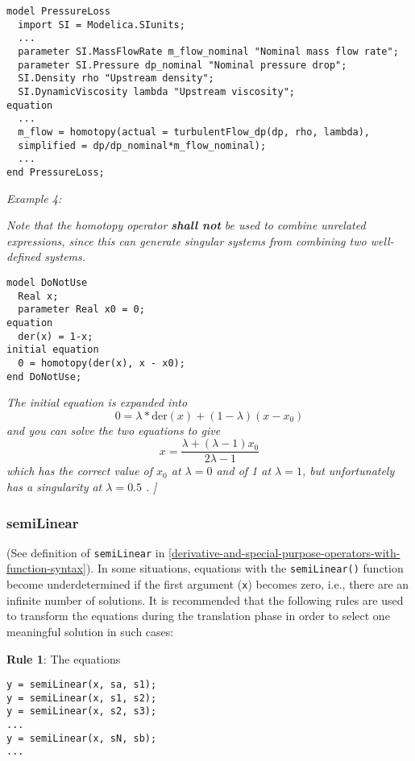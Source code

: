 \begin{lstlisting}[language=modelica]
model PressureLoss
  import SI = Modelica.SIunits;
  ...
  parameter SI.MassFlowRate m_flow_nominal "Nominal mass flow rate";
  parameter SI.Pressure dp_nominal "Nominal pressure drop";
  SI.Density rho "Upstream density";
  SI.DynamicViscosity lambda "Upstream viscosity";
equation
  ...
  m_flow = homotopy(actual = turbulentFlow_dp(dp, rho, lambda),
  simplified = dp/dp_nominal*m_flow_nominal);
  ...
end PressureLoss;
\end{lstlisting}

\emph{Example 4:}

\emph{Note that the homotopy operator \textbf{shall not} be used to
combine unrelated expressions, since this can generate singular systems
from combining two well-defined systems.}

\begin{lstlisting}[language=modelica]
model DoNotUse
  Real x;
  parameter Real x0 = 0;
equation
  der(x) = 1-x;
initial equation
  0 = homotopy(der(x), x - x0);
end DoNotUse;
\end{lstlisting}

\emph{The initial equation is expanded into}
$$ 0 = \lambda*\mathrm{der}(x)+(1-\lambda)(x-x_0)$$
\emph{and you can solve the two equations to give}
$$ x=\frac{\lambda+(\lambda-1)x_0}{2\lambda-1}$$
\emph{which has the correct value of $x_0$ at $\lambda = 0$ and of 1 at $\lambda= 1$, but unfortunately has a singularity at $\lambda = 0.5 $ .}
\emph{{]}}

\subsubsection{semiLinear}

(See definition of \lstinline[basicstyle=\ttfamily]!semiLinear! in \autoref{derivative-and-special-purpose-operators-with-function-syntax}). In some situations,
equations with the \lstinline[basicstyle=\ttfamily]!semiLinear()! function become underdetermined if the
first argument (\lstinline[basicstyle=\ttfamily]!x!) becomes zero, i.e., there are an infinite number of
solutions. It is recommended that the following rules are used to
transform the equations during the translation phase in order to select
one meaningful solution in such cases:

\textbf{Rule 1}: The equations

\begin{lstlisting}[language=modelica]
y = semiLinear(x, sa, s1);
y = semiLinear(x, s1, s2);
y = semiLinear(x, s2, s3);
...
y = semiLinear(x, sN, sb);
...
\end{lstlisting}

